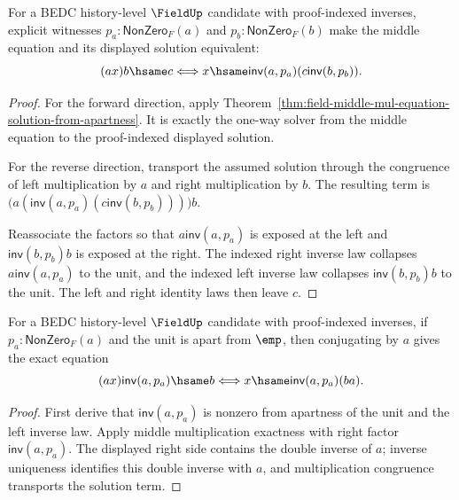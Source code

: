 \begin{theorem}
\label{thm:field-middle-mul-equation-exact-from-apartness}
For a BEDC history-level $\FieldUp$ candidate with proof-indexed inverses,
explicit witnesses $p_a:\mathsf{NonZero}_F(a)$ and
$p_b:\mathsf{NonZero}_F(b)$ make the middle equation and its displayed
solution equivalent:
$$
(a x)b\hsame c
\Longleftrightarrow
x\hsame \mathsf{inv}(a,p_a)(c\mathsf{inv}(b,p_b)).
$$
\end{theorem}
\begin{proof}
For the forward direction, apply
Theorem~\ref{thm:field-middle-mul-equation-solution-from-apartness}. It is
exactly the one-way solver from the middle equation to the proof-indexed
displayed solution.

For the reverse direction, transport the assumed solution through the
congruence of left multiplication by $a$ and right multiplication by $b$.
The resulting term is
$\bigl(a(\mathsf{inv}(a,p_a)(c\mathsf{inv}(b,p_b)))\bigr)b$.

Reassociate the factors so that $a\mathsf{inv}(a,p_a)$ is exposed at the
left and $\mathsf{inv}(b,p_b)b$ is exposed at the right. The indexed right
inverse law collapses $a\mathsf{inv}(a,p_a)$ to the unit, and the indexed
left inverse law collapses $\mathsf{inv}(b,p_b)b$ to the unit. The left and
right identity laws then leave $c$.
\end{proof}

\begin{theorem}
\label{thm:field-conjugation-equation-exact-from-apartness}
For a BEDC history-level $\FieldUp$ candidate with proof-indexed inverses, if
$p_a:\mathsf{NonZero}_F(a)$ and the unit is apart from $\emp$, then conjugating
by $a$ gives the exact equation
$$
(a x)\mathsf{inv}(a,p_a)\hsame b
\Longleftrightarrow
x\hsame \mathsf{inv}(a,p_a)(b a).
$$
\end{theorem}
\begin{proof}
First derive that $\mathsf{inv}(a,p_a)$ is nonzero from apartness of the unit
and the left inverse law. Apply middle multiplication exactness with right
factor $\mathsf{inv}(a,p_a)$. The displayed right side contains the double
inverse of $a$; inverse uniqueness identifies this double inverse with $a$,
and multiplication congruence transports the solution term.
\end{proof}

